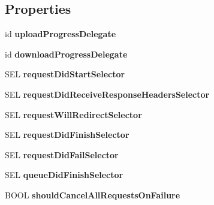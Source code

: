 \subsection*{\-Properties}
\begin{DoxyCompactItemize}
\item 
\hypertarget{interface_a_s_i_network_queue_ab7fe37cc9051ccd13ab3aeef7e8d6479}{
id {\bfseries upload\-Progress\-Delegate}}
\label{interface_a_s_i_network_queue_ab7fe37cc9051ccd13ab3aeef7e8d6479}

\item 
\hypertarget{interface_a_s_i_network_queue_a96c9d1d79946b7b579ee8a927298e5f0}{
id {\bfseries download\-Progress\-Delegate}}
\label{interface_a_s_i_network_queue_a96c9d1d79946b7b579ee8a927298e5f0}

\item 
\hypertarget{interface_a_s_i_network_queue_ad6553f286d940f1652d5ba4ac0fa555e}{
\-S\-E\-L {\bfseries request\-Did\-Start\-Selector}}
\label{interface_a_s_i_network_queue_ad6553f286d940f1652d5ba4ac0fa555e}

\item 
\hypertarget{interface_a_s_i_network_queue_accd8324dcddfa88132924442c51db6fa}{
\-S\-E\-L {\bfseries request\-Did\-Receive\-Response\-Headers\-Selector}}
\label{interface_a_s_i_network_queue_accd8324dcddfa88132924442c51db6fa}

\item 
\hypertarget{interface_a_s_i_network_queue_a5c2662583637e1f7077ea3451c332c14}{
\-S\-E\-L {\bfseries request\-Will\-Redirect\-Selector}}
\label{interface_a_s_i_network_queue_a5c2662583637e1f7077ea3451c332c14}

\item 
\hypertarget{interface_a_s_i_network_queue_ac8b9b906deaecd8a59d370d88129b3ad}{
\-S\-E\-L {\bfseries request\-Did\-Finish\-Selector}}
\label{interface_a_s_i_network_queue_ac8b9b906deaecd8a59d370d88129b3ad}

\item 
\hypertarget{interface_a_s_i_network_queue_a958b009cbd9758186f6ee80e1f9e8192}{
\-S\-E\-L {\bfseries request\-Did\-Fail\-Selector}}
\label{interface_a_s_i_network_queue_a958b009cbd9758186f6ee80e1f9e8192}

\item 
\hypertarget{interface_a_s_i_network_queue_a6ccfadf78ae1de4c5d339a5abfc30b53}{
\-S\-E\-L {\bfseries queue\-Did\-Finish\-Selector}}
\label{interface_a_s_i_network_queue_a6ccfadf78ae1de4c5d339a5abfc30b53}

\item 
\hypertarget{interface_a_s_i_network_queue_a34b187d9867b55c8444abc6cd6bee2ca}{
\-B\-O\-O\-L {\bfseries should\-Cancel\-All\-Requests\-On\-Failure}}
\label{interface_a_s_i_network_queue_a34b187d9867b55c8444abc6cd6bee2ca}


\end{DoxyCompactItemize}
